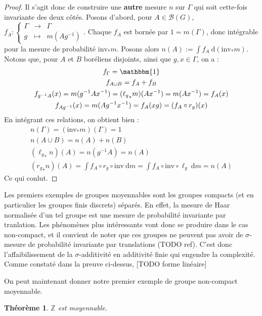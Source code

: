 \documentclass[a4paper,12pt]{article}
\newtheorem{theorem}{Théorème}[section]
\newcommand{\Z}{\mathbb{Z}}
\newcommand{\Bor}{\mathcal{B}}
\newcommand{\indic}{\mathbbm{1}}
\newcommand{\integral}[2]{\int #1~\mathrm{d}#2}
\newcommand\fundef[3]{#1: \left\{\begin{array}{ccc}#2\\#3\end{array}\right.}
\newcommand{\inv}{^{-1}}
\newcommand{\comp}{\circ}
\newcommand{\invop}{\mathrm{inv}}
\begin{document}
\begin{proof}
    Il s'agit donc de construire une \textbf{autre} mesure $n$ sur $\Gamma$ qui soit cette-fois invariante des deux côtés.
    Posons d'abord, pour $A\in\Bor(G)$, $\fundef{f_A}{\Gamma&\to& \Gamma}{g&\mapsto& m(Ag\inv)}$. Chaque $f_A$ est bornée par $1 = m(\Gamma)$, 
    donc intégrable pour la mesure de probabilité $\invop_*m$. Posons alors $n(A) := \integral{f_A}{(\invop_*m)}$. \\
    Notons que, pour $A$ et $B$ boréliens disjoints, ainsi que $g, x\in\Gamma$, on a :
    \begin{gather*}
        f_\Gamma = \indic \\
        f_{A\cup B} = f_A + f_B \\
        f_{g\inv A}(x) = m(g\inv Ax\inv) = ({\ell_g}_*m)(Ax\inv) = m(Ax\inv) = f_A(x) \\
        f_{Ag\inv}(x) = m(Ag\inv x\inv) = f_A(xg) = (f_A \comp r_g)(x)
    \end{gather*}
    En intégrant ces relations, on obtient bien :
    \begin{gather*}
        n(\Gamma) = (\invop_*m)(\Gamma) = 1 \\
        n(A\cup B) = n(A) + n(B) \\
        ({\ell_g}_*n)(A) = n(g\inv A) = n(A) \\
        ({r_g}_*n)(A) = \integral{f_A\comp r_g\comp\invop}{m} = \integral{f_A\comp\invop\comp \ell_g}{m} = n(A)
    \end{gather*}
    Ce qui conlut.
\end{proof}

Les premiers exemples de groupes moyennables sont les groupes compacts (et en particulier les groupes finis discrets) séparés.
En effet, la mesure de Haar normalisée d'un tel groupe est une mesure de probabilité invariante par tranlation. Les phénomènes
plus intéressants vont donc se produire dans le cas non-compact, et il convient de noter que ces groupes ne peuvent pas avoir
de $\sigma$-mesure de probabilité invariante par translations (TODO ref). C'est donc l'affaibilissement de la 
$\sigma$-additivité en additivité finie qui engendre la complexité. \\

Comme constaté dans la preuve ci-dessus, [TODO forme linéaire]

On peut maintenant donner notre premier exemple de groupe non-compact moyennable.

\begin{theorem}\label{Z_amenable}
    $\Z$ est moyennable.
\end{theorem}
\end{document}
